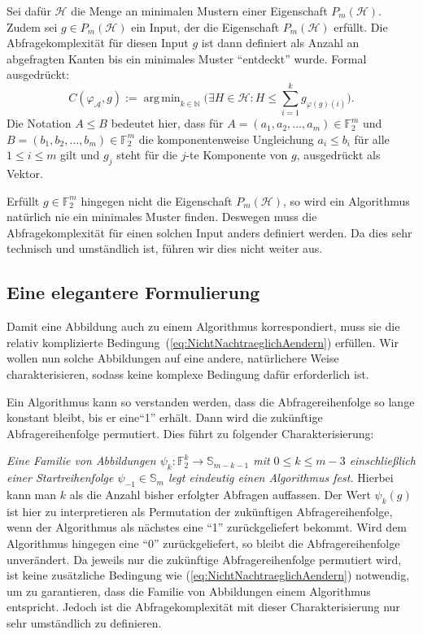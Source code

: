 \documentclass[10pt,a4paper, footheight=1mm]{scrreprt}
\theoremstyle{definition}
\DeclareMathOperator*\argmin{arg\,min}
\begin{document}
Sei dafür $\mathcal{H}$ die Menge an minimalen
Mustern einer Eigenschaft $P_m(\mathcal{H})$.
Zudem sei $g\in P_m(\mathcal{H})$ ein Input, der die
Eigenschaft $P_m(\mathcal{H})$ erfüllt.
Die Abfragekomplexität für diesen Input $g$
ist dann definiert als Anzahl an abgefragten Kanten
bis ein minimales Muster "`entdeckt"' wurde.
Formal ausgedrückt:
$$ C(\varphi_\mathcal{A}, g) :=
\argmin_{k\in\mathbb{N}} \Big(\exists H\in\mathcal{H}:
H \leq \sum_{i=1}^k g_{\varphi(g)(i)} \Big).
$$
Die Notation $A\leq B$ bedeutet hier, dass
für $A=(a_1, a_2, \dots, a_m)\in \mathbb{F}_2^m$
und $B=(b_1, b_2, \dots, b_m)\in \mathbb{F}_2^m$
die komponentenweise Ungleichung $a_i \leq b_i$
für alle $1\leq i\leq m$ gilt und $g_j$ steht für
die $j$-te Komponente von $g$, ausgedrückt als
Vektor.

Erfüllt $g\in\mathbb{F}_2^m$ hingegen nicht die
Eigenschaft $P_m(\mathcal{H})$, so wird ein Algorithmus
natürlich nie ein minimales Muster finden. Deswegen
muss die Abfragekomplexität für einen solchen
Input anders definiert werden. Da dies sehr 
technisch und umständlich ist, führen wir
dies nicht weiter aus.

\subsection{Eine elegantere Formulierung}
Damit eine Abbildung auch zu einem Algorithmus
korrespondiert, muss sie die relativ komplizierte
Bedingung~(\ref{eq:NichtNachtraeglichAendern})
erfüllen. Wir wollen nun solche Abbildungen
auf eine andere, natürlichere
Weise charakterisieren, sodass keine komplexe Bedingung
dafür erforderlich ist.

Ein Algorithmus kann so verstanden werden, dass die
Abfragereihenfolge so lange konstant bleibt, bis er
eine"`1"' erhält. Dann wird die zukünftige Abfragereihenfolge
permutiert. Dies führt zu folgender Charakterisierung:

\emph{Eine Familie von Abbildungen 
$\psi_k:\mathbb{F}_2^k \to \mathbb{S}_{m-k-1}$
mit $0 \leq k \leq m-3$ einschließlich einer Startreihenfolge
$\psi_{-1}\in\mathbb{S}_m$ legt eindeutig einen Algorithmus fest.}
Hierbei kann man $k$ als die Anzahl bisher erfolgter Abfragen
auffassen. Der Wert $\psi_k(g)$ ist hier zu interpretieren
als Permutation der zukünftigen Abfragereihenfolge, wenn
der Algorithmus als nächstes eine "`1"' zurückgeliefert bekommt.
Wird dem Algorithmus hingegen eine "`0"' zurückgeliefert, so
bleibt die Abfragereihenfolge unverändert.
Da jeweils nur die zukünftige Abfragereihenfolge permutiert 
wird, ist keine zusätzliche Bedingung wie 
(\ref{eq:NichtNachtraeglichAendern}) notwendig, um zu garantieren,
dass die Familie von Abbildungen einem Algorithmus entspricht.
Jedoch ist die Abfragekomplexität mit dieser Charakterisierung
nur sehr umständlich zu definieren.
\end{document}
